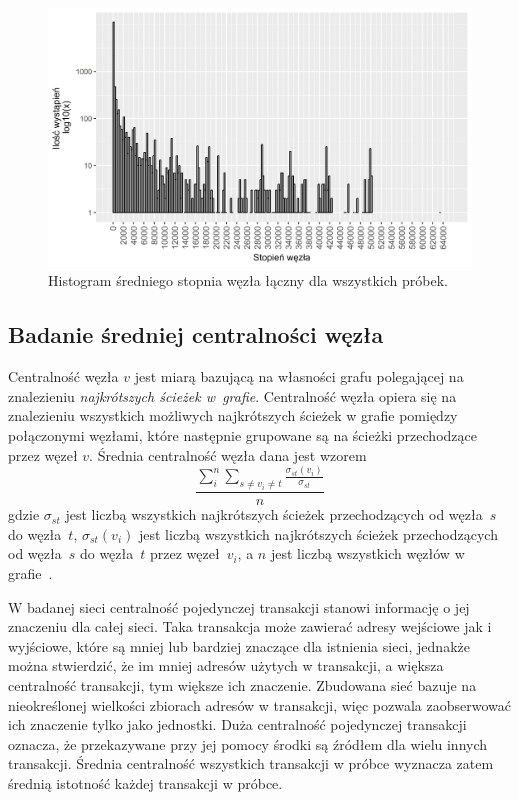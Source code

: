 \documentclass[12pt, oneside, final, openany]{mgr}
\newcommand{\chartsWidth}{0.80}
\begin{document}
\begin{figure}[H]
   \includegraphics[width=\chartsWidth\linewidth]{pictures/sredni_stopien_wezla/sredni_stopien_wezla_hist.png}
   \caption{Histogram średniego stopnia węzła łączny dla wszystkich próbek.}
   \label{fig:sw3}
\end{figure}

\subsection{Badanie średniej centralności węzła}
\label{srednia_centralnosc}
\indent Centralność węzła $v$ jest miarą bazującą na własności grafu polegającej na znalezieniu \textit{najkrótszych ścieżek w~grafie}. Centralność węzła opiera się na znalezieniu wszystkich możliwych najkrótszych ścieżek w grafie pomiędzy połączonymi węzłami, które następnie grupowane są na ścieżki przechodzące przez węzeł $v$. Średnia centralność węzła dana jest wzorem 
\begin{equation}
\label{eq:centralnosc}
  \frac{\sum_i^n\sum_{s \ne v_i \ne t}^{}\frac{\sigma_{st}(v_i)}{\sigma_{st}}}{n}
\end{equation} 
gdzie $\sigma_{st}$ jest liczbą wszystkich najkrótszych ścieżek przechodzących od węzła~$s$ do węzła~$t$, $\sigma_{st}(v_i)$ jest liczbą wszystkich najkrótszych ścieżek przechodzących od węzła~$s$ do węzła~$t$ przez węzeł~$v_i$, a $n$ jest liczbą wszystkich węzłów w grafie~\cite{barabasi2016network}.

\indent W badanej sieci centralność pojedynczej transakcji stanowi informację o jej znaczeniu dla całej sieci. Taka transakcja może zawierać adresy wejściowe jak i wyjściowe, które są mniej lub bardziej znaczące dla istnienia sieci, jednakże można stwierdzić, że im mniej adresów użytych w transakcji, a większa centralność transakcji, tym większe ich znaczenie. Zbudowana sieć bazuje na nieokreślonej wielkości zbiorach adresów w transakcji, więc pozwala zaobserwować ich znaczenie tylko jako jednostki. Duża centralność pojedynczej transakcji oznacza, że przekazywane przy jej pomocy środki są źródłem dla wielu innych transakcji. Średnia centralność wszystkich transakcji w próbce wyznacza zatem średnią istotność każdej transakcji w próbce.
\end{document}
